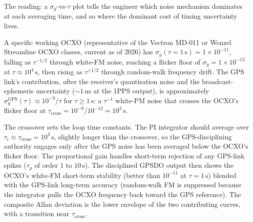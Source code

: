 The reading: a $\sigma_{y}$-vs-$\tau$ plot tells the engineer
which noise mechanism dominates at each averaging time, and so
where the dominant cost of timing uncertainty lives.

A specific working OCXO (representative of the Vectron MD-011 or
Wenzel Streamline OCXO classes, current as of 2026) has
$\sigma_{y}(\tau = 1 \,\si{\second}) = 1 \times 10^{-11}$, falling
as $\tau^{-1/2}$ through white-FM noise, reaching a flicker floor
of $\sigma_{y} = 1 \times 10^{-12}$ at $\tau \approx 10^{4} \,\si{
\second}$, then rising as $\tau^{+1/2}$ through random-walk
frequency drift. The GPS link's contribution, after the receiver's
quantisation noise and the broadcast-ephemeris uncertainty
($\sim 1 \,\si{\nano\second}$ at the 1PPS output), is approximately
$\sigma_{y}^{\text{GPS}}(\tau) \approx 10^{-9}/\tau$ for $\tau \geq
1 \,\si{\second}$: a $\tau^{-1}$ white-PM noise that crosses the
OCXO's flicker floor at $\tau_{\text{cross}} = 10^{-9}/10^{-12} =
10^{3} \,\si{\second}$.

The crossover sets the loop time constants. The PI integrator
should average over $\tau_{i} \approx \tau_{\text{cross}} =
10^{3} \,\si{\second}$, slightly longer than the crossover, so the
GPS-disciplining authority engages only after the GPS noise has
been averaged below the OCXO's flicker floor. The proportional
gain handles short-term rejection of any GPS-link spikes
($\tau_{p}$ of order $1$ to $10 \,\si{\second}$). The disciplined
GPSDO output then shows the OCXO's white-FM short-term stability
(better than $10^{-11}$ at $\tau = 1 \,\si{\second}$) blended with
the GPS-link long-term accuracy (random-walk FM is suppressed
because the integrator pulls the OCXO frequency back toward the
GPS reference). The composite Allan deviation is the lower
envelope of the two contributing curves, with a transition near
$\tau_{\text{cross}}$.

